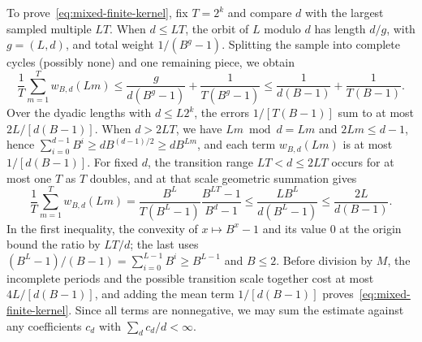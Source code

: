 \documentclass[11pt]{article}
\begin{document}
To prove~\eqref{eq:mixed-finite-kernel}, fix $T=2^k$ and compare $d$
with the largest sampled multiple $LT$. When $d\le LT$, the orbit of
$L$ modulo $d$ has length $d/g$, with $g=(L,d)$, and total weight
$1/(B^g-1)$. Splitting the sample into complete cycles (possibly none)
and one remaining piece, we obtain
\[
 \frac1T\sum_{m=1}^T w_{B,d}(Lm)
 \le\frac{g}{d(B^g-1)}+\frac1{T(B^g-1)}
 \le\frac1{d(B-1)}+\frac1{T(B-1)}.
\]
Over the dyadic lengths with $d\le L2^k$, the errors $1/[T(B-1)]$ sum
to at most $2L/[d(B-1)]$. When $d>2LT$, we have $Lm\bmod d=Lm$ and
$2Lm\le d-1$, hence
$\sum_{i=0}^{d-1}B^i\ge dB^{(d-1)/2}\ge dB^{Lm}$, and each term
$w_{B,d}(Lm)$ is at most $1/[d(B-1)]$. For fixed $d$, the transition
range $LT<d\le2LT$ occurs for at most one $T$ as $T$ doubles, and at
that scale geometric summation gives
\[
 \frac1T\sum_{m=1}^T w_{B,d}(Lm)
 =\frac{B^L}{T(B^L-1)}\frac{B^{LT}-1}{B^d-1}
 \le\frac{LB^L}{d(B^L-1)}
 \le\frac{2L}{d(B-1)}.
\]
In the first inequality, the convexity of $x\mapsto B^x-1$ and its
value $0$ at the origin bound the ratio by $LT/d$; the last uses
$(B^L-1)/(B-1)=\sum_{i=0}^{L-1}B^i\ge B^{L-1}$ and $B\le2$. Before
division by $M$, the incomplete periods and the possible transition
scale together cost at most $4L/[d(B-1)]$, and adding the mean term
$1/[d(B-1)]$ proves~\eqref{eq:mixed-finite-kernel}. Since all terms
are nonnegative, we may
sum the estimate against any coefficients $c_d$ with
$\sum_dc_d/d<\infty$.
\end{document}
